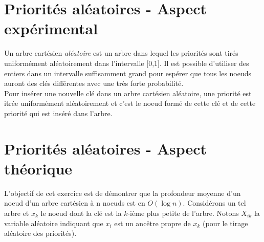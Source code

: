 \documentclass[a4paper,12pt]{report}
\begin{document}

\newpage

\renewcommand{\chaptername}{Exercice}
\chapter{Priorités aléatoires - Aspect expérimental}

Un arbre cartésien \textit{aléatoire} est un arbre dans lequel les priorités sont tirés uniformément aléatoirement dans l'intervalle [0,1]. Il est possible
    d'utiliser des entiers dans un intervalle suffisamment grand pour espérer que tous les noeuds auront des clés différentes avec une très forte probabilité.\\

Pour insérer une nouvelle clé dans un arbre cartésien aléatoire, une priorité est itrée uniformément aléatoirement et c'est le noeud formé de cette clé et de
    cette priorité qui est inséré dans l'arbre.





\newpage

\renewcommand{\chaptername}{Exercice}
\chapter{Priorités aléatoires - Aspect théorique}

L'objectif de cet exercice est de démontrer que la profondeur moyenne d'un noeud d'un arbre cartésien à n noeuds est en \( O(\log n) \). Considérons un tel
    arbre et \( x_k \) le noeud dont la clé est la \( k \)-ième plus petite de l'arbre. Notons \( X_{ik} \) la variable aléatoire indiquant que \( x_i \) est
    un ancêtre propre de \( x_k \) (pour le tirage aléatoire des priorités).




\vspace{1.5cm}
\end{document}
